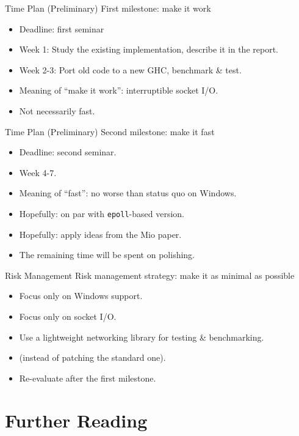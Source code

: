 \documentclass{beamer}
\begin{document}
\begin{frame}{Time Plan (Preliminary)}
  First milestone: make it work
  \begin{itemize}
    \item Deadline: first seminar
    \item Week 1: Study the existing implementation, describe it in the report.
    \item Week 2-3: Port old code to a new GHC, benchmark \& test.
    \item Meaning of ``make it work'': interruptible socket I/O.
    \item Not necessarily fast.
  \end{itemize}
\end{frame}

\begin{frame}{Time Plan (Preliminary)}
  Second milestone: make it fast
  \begin{itemize}
    \item Deadline: second seminar.
    \item Week 4-7.
    \item Meaning of ``fast'': no worse than status quo on Windows.
    \item Hopefully: on par with \texttt{epoll}-based version.
    \item Hopefully: apply ideas from the Mio paper.
    \item The remaining time will be spent on polishing.
  \end{itemize}
\end{frame}

\begin{frame}{Risk Management}
  Risk management strategy: make it as minimal as possible
  \begin{itemize}
    \item Focus only on Windows support.
    \item Focus only on socket I/O.
    \item Use a lightweight networking library for testing \& benchmarking.
    \item (instead of patching the standard one).
    \item Re-evaluate after the first milestone.
  \end{itemize}
\end{frame}


\section {Further Reading}
\end{document}
